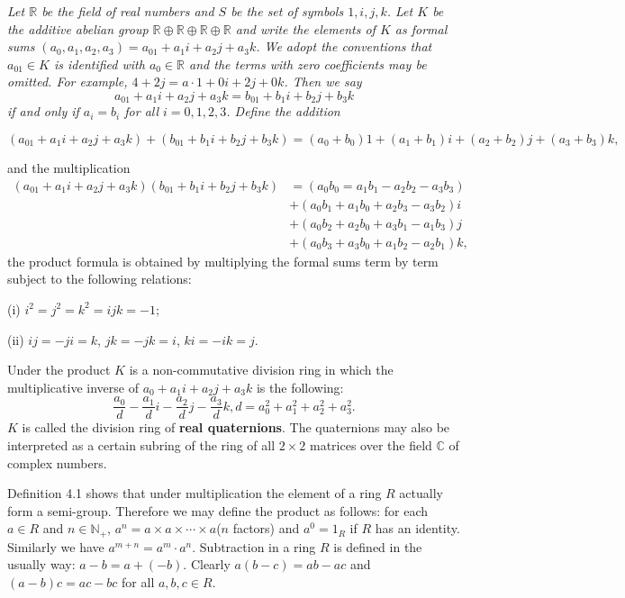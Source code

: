 \begin{example}\em
Let $\mathbb{R}$ be the field of real numbers and $S$ be the set of symbols $1,i,j,k$. Let $K$ be the additive abelian group $\mathbb{R}\oplus\mathbb{R}\oplus\mathbb{R}\oplus\mathbb{R}$ and write the elements of $K$ as formal sums $(a_0,a_1,a_2,a_3)=a_01+a_1i+a_2j+a_3k$. We adopt the conventions that $a_01\in K$ is identified with $a_0\in\mathbb{R}$ and the terms with zero coefficients may be omitted. For example, $4+2j=a\cdot1+0i+2j+0k$. Then we say 
$$
a_01+a_1i+a_2j+a_3k=b_01+b_1i+b_2j+b_3k
$$
if and only if $a_i=b_i$ for all $i=0,1,2,3$. Define the addition 
\begin{small}
$$
\left( a_01+a_1i+a_2j+a_3k \right) +\left( b_01+b_1i+b_2j+b_3k \right) =\left( a_0+b_0 \right) 1+\left( a_1+b_1 \right) i+\left( a_2+b_2 \right) j+\left( a_3+b_3 \right) k,
$$
\end{small}
and the multiplication 
$$
\begin{aligned}
\left( a_01+a_1i+a_2j+a_3k \right) \left( b_01+b_1i+b_2j+b_3k \right) &=\left( a_0b_0=a_1b_1-a_2b_2-a_3b_3 \right) 
\\
&+\left( a_0b_1+a_1b_0+a_2b_3-a_3b_2 \right) i
\\
&+\left( a_0b_2+a_2b_0+a_3b_1-a_1b_3 \right) j
\\
&+\left( a_0b_3+a_3b_0+a_1b_2-a_2b_1 \right) k,
\end{aligned}
$$
the product formula is obtained by multiplying the formal sums term by term subject to the following relations:\par
(i) $i^2=j^2=k^2=ijk=-1$;\par
(ii) $ij=-ji=k$, $jk=-jk=i$, $ki=-ik=j$.\par
Under the product $K$ is a non-commutative division ring in which the multiplicative inverse of $a_0+a_1i+a_2j+a_3k$ is the following:
$$
\frac{a_0}{d}-\frac{a_1}{d}i-\frac{a_2}{d}j-\frac{a_3}{d}k,d=a_{0}^{2}+a_{1}^{2}+a_{2}^{2}+a_{3}^{2}.
$$
$K$ is called the division ring of \textbf{real quaternions}. The quaternions may also be interpreted as a certain subring of the ring of all $2\times 2$ matrices over the field $\mathbb{C}$ of complex numbers.
\end{example}
Definition 4.1 shows that under multiplication the element of a ring $R$ actually form a semi-group. Therefore we may define the product as follows: for each $a\in R$ and $n\in\mathbb{N}_+$, $a^n=a\times a\times\cdots\times a$($n$ factors) and $a^0=1_R$ if $R$ has an identity. Similarly we have $a^{m+n}=a^m\cdot a^n$. Subtraction in a ring $R$ is defined in the usually way: $a-b=a+(-b)$. Clearly $a(b-c)=ab-ac$ and $(a-b)c=ac-bc$ for all $a,b,c\in R$.\par
